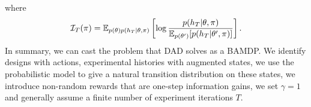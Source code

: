 \documentclass[a4paper, 10pt]{report}
\theoremstyle{plain}
\begin{document}
	where 
	\begin{equation}
	\mathcal{I}_T(\pi) = \mathbb{E}_{p(\theta)p(h_T|\theta,\pi)}\left[ \log\frac{p(h_T|\theta,\pi)}{\mathbb{E}_{p(\theta')}[p(h_T|\theta',\pi)]} \right].
	\end{equation}
	In summary, we can cast the problem that DAD solves as a BAMDP. We identify designs with actions, experimental histories with augmented states, we use the probabilistic model to give a natural transition distribution on these states, we introduce non-random rewards that are one-step information gains, we set $\gamma=1$ and generally assume a finite number of experiment iterations $T$.
	
\end{document}
